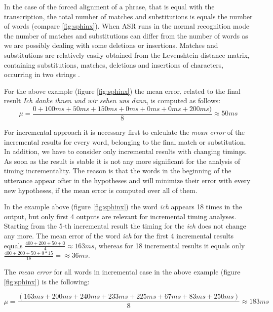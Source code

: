 In the case of the forced alignment of a phrase, that is equal with the
transcription, the total number of matches and substitutions is equals the
number of words (compare \ref{fig:sphinx}). When ASR runs in the normal
recognition mode the number of matches and substitutions can differ from the number of words as we are possibly  dealing with some deletions or insertions. Matches and
substitutions are relatively easily obtained from the 
Levenshtein distance matrix, containing substitutions, matches, deletions and
insertions of characters, occurring in two strings \parencite {levenshtein1966}.  

For the above example (figure \ref{fig:sphinx}) the mean  error, related to
the final result \textit {Ich danke ihnen und wir sehen uns dann}, is computed
as follows:
\begin{equation} \mu=\frac{0+100ms+50 ms+150ms+0
ms+0 ms+0 ms+200ms)}{8} \approx 50 ms
\label{eq:mean_comp}
\end{equation}

For incremental approach it is necessary first to calculate the \textit {
 mean error} of the incremental results for every word, belonging to the final match or
substitution. In addition, we have to consider only incremental results with
changing timings. As soon as the result is stable it is not any more significant
for the analysis of timing incrementality. The reason is that the words in the
beginning of the utterance appear ofter in the hypotheses and will minimize their error with
every new hypotheses, if the mean error is computed over all of them.  

In the example above (figure \ref{fig:sphinx}) the word \textit  {ich} 
appears 18 times in the output, but only first 4 outputs are relevant for incremental timing
analyses.  Starting from the 5-th incremental result the timing for the \textit
{ich} does not change any more.  The mean error of the word \textit {ich} for
the first 4 incremental results equals $\frac {400+200+50+0}{4}\approx 163 ms$, whereas for 18 incremental results 
it equals only $\frac {400+200+50+0*15}{18}=\approx 36 ms$. 

The \textit {mean error} for all words in incremental case in the above example
(figure \ref{fig:sphinx}) is the following:

\begin{equation} \mu=\frac{(163 ms +200ms +240 ms+233 ms+225ms+67
ms+83 ms+250 ms)}{8} \approx 183 ms
\label{eq:mean_comp_inc}
\end{equation}

